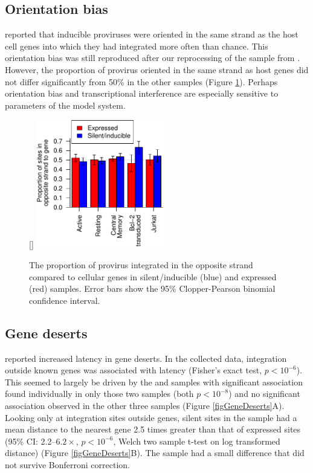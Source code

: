 \documentclass[../sherrill-Mix_thesis.tex]{subfiles}
\begin{document}
	\subsection{Orientation bias}
	\citet{Shan2011} reported that inducible proviruses were oriented in the same strand as the host cell genes into which they had integrated more often than chance. This orientation bias was still reproduced after our reprocessing of the \Bcl{} sample from  \citet{Shan2011}. However, the proportion of provirus oriented in the same strand as host genes did not differ significantly from 50\% in the other samples (Figure \ref{figOrient}). Perhaps orientation bias and transcriptional interference are especially sensitive to parameters of the model system.
	\begin{figure}
		\centering
			[\FBwidth]{
				\includegraphics[width=0.5\textwidth]{strandBias.pdf} %
			}{
				\caption[Strand orientation and latency]{The proportion of provirus integrated in the opposite strand compared to cellular genes in silent/inducible (blue) and expressed (red) samples. Error bars show the 95\% Clopper-Pearson binomial confidence interval.}
			}
		\label{figOrient}
	\end{figure}


	\subsection{Gene deserts}
	\citet{Lewinski2005} reported increased latency in gene deserts. In the collected data, integration outside known genes was associated with latency (Fisher's exact test, $p<10^{-6}$).  This seemed to largely be driven by the \Active{} and \Resting{} samples with significant association found individually in only those two samples (both $p<10^{-8}$) and no significant association observed in the other three samples (Figure \ref{figGeneDeserts}A). Looking only at integration sites outside genes, silent sites in the \Resting{} sample had a mean distance to the nearest gene 2.5 times greater than that of expressed sites (95\% CI: 2.2--$6.2\times$, $p<10^{-6}$, Welch two sample t-test on log transformed distance) (Figure \ref{figGeneDeserts}B). The \Active{} sample had a small difference that did not survive Bonferroni correction.
\end{document}
